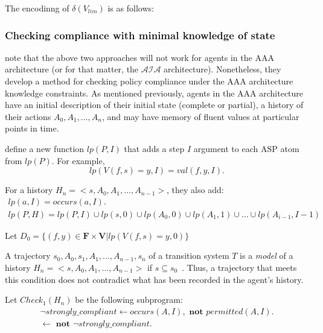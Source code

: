 The encodinng of $\delta(V_{lim})$ is as follows:


%



\subsubsection{Checking compliance with minimal knowledge of state}

\citet{gelfond_authorization_2008} note that the above two approaches will not work for agents in the AAA architecture (or for that matter, the $\mathcal{AIA}$ architecture).
Nonetheless, they develop a method for checking policy compliance under the AAA architecture knowledge constraints.
As mentioned previously, agents in the AAA architecture have an initial description of their initial state (complete or partial), a history of their actions $A_0, A_1, \dots, A_n$, and may have memory of fluent values at particular points in time.

\citet{gelfond_authorization_2008} define a new function $lp(P, I)$ that adds a step $I$ argument to each ASP atom from $lp(P)$.
For example,
\[
lp(V(f,s)=y, I) = val(f,y,I).
\]

For a history $H_n=<s, A_0, A_1, \dots, A_{n-1}>$, they also add:
\begin{gather*}
    lp(a, I)=occurs(a, I). \\
    lp(P, H) = lp(P, I) \cup lp(s, 0) \cup lp(A_0, 0) \cup lp(A_1, 1) \cup \dots \cup lp(A_{i-1}, I-1)
\end{gather*}

Let $D_0 = \{ (f,y) \in \boldsymbol{F} \times \boldsymbol{V} | lp(V(f,s)=y, 0)\}$

\begin{definition}
    \label{def:model_of_history}
    A trajectory $s_0, A_0, s_1, A_1, \dots, A_{n-1}, s_n$ of a transition system $T$ is a \textit{model} of a history $H_n = <s, A_0, A_1, \dots, A_{n-1}>$ if $s \subseteq s_0$~\citep{gelfond_authorization_2008}.
    Thus, a trajectory that meets this condition does not contradict what has been recorded in the agent's history.
\end{definition}

Let $Check_1(H_n)$ be the following subprogram:
\begin{gather*}
    \neg strongly\_compliant \leftarrow occurs(A, I), \textbf{ not } permitted(A, I). \\
    \leftarrow \textbf{ not } \neg strongly\_compliant.
\end{gather*}

